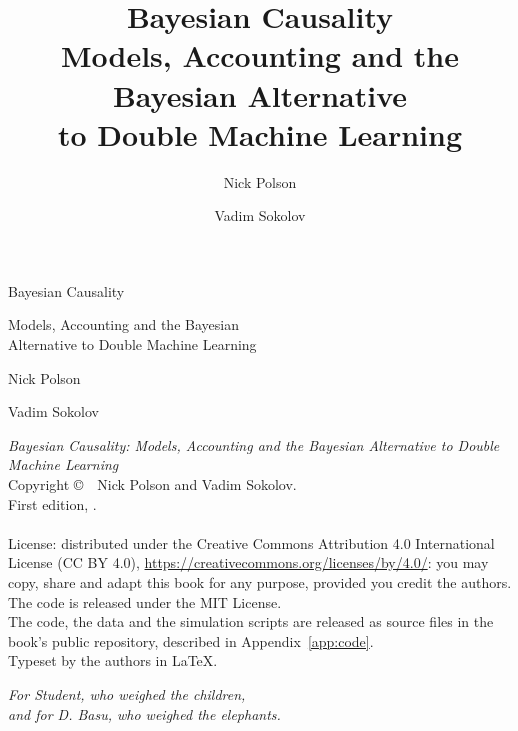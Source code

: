\documentclass[10pt,openany,twoside]{book}
\title{Bayesian Causality\\[1ex]\large Models, Accounting and the Bayesian Alternative\\to Double Machine Learning}
\author{Nick Polson \and Vadim Sokolov}
\date{}
\makeatletter
\theoremstyle{definition}
\theoremstyle{remark}
\renewcommand\frontmatter{\clearpage\@mainmatterfalse\pagenumbering{roman}}
\makeatother
\begin{document}
\frontmatter
\pagestyle{empty}
\thispagestyle{empty}
\begin{center}
\vspace*{1.5in}
{\Huge Bayesian Causality\par}
\vspace{0.3in}
{\Large Models, Accounting and the Bayesian\\ Alternative to Double Machine Learning\par}
\vspace{1in}
{\Large Nick Polson\par}
\vspace{0.15in}
{\Large Vadim Sokolov\par}
\vfill
\end{center}
\clearpage
\thispagestyle{empty}
\vspace*{\fill}
{\footnotesize\noindent
\emph{Bayesian Causality: Models, Accounting and the Bayesian Alternative to Double Machine Learning}\\[1ex]
Copyright \copyright\ \BookYear\ Nick Polson and Vadim Sokolov.\\[1ex]
First edition, \BookYear.%
\ifx\BookDOIline\empty\else\\[1ex]\BookDOIline\fi
\\[1ex]
License: distributed under the Creative Commons Attribution 4.0 International License (CC BY 4.0), \url{https://creativecommons.org/licenses/by/4.0/}: you may copy, share and adapt this book for any purpose, provided you credit the authors. The code is released under the MIT License.\\[1ex]
The code, the data and the simulation scripts are released as source files in the book's public repository, described in Appendix~\ref{app:code}.\\[1ex]
Typeset by the authors in \LaTeX.\par}
\clearpage
\thispagestyle{empty}
\vspace*{2in}
\begin{center}
\emph{For Student, who weighed the children,\\ and for D. Basu, who weighed the elephants.}
\end{center}
\clearpage
\thispagestyle{empty}
\vspace*{1.6in}
\end{document}
